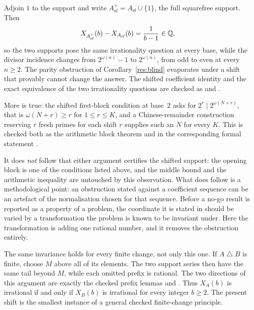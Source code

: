 \documentclass[11pt]{article}
\newcommand{\Asf}{A_{\mathrm{sf}}}
\begin{document}
Adjoin $1$ to the support and write $\Asf^{+}=\Asf\cup\{1\}$, the full
squarefree support.  Then
\[
  X_{\Asf^{+}}(b)-X_{\Asf}(b)=\frac1{b-1}\in\Q ,
\]
so the two supports pose the same irrationality question at every base, while
the divisor incidence changes from $2^{\omega(n)}-1$ to $2^{\omega(n)}$,
from odd to even at every $n\ge2$.  The parity obstruction of
Corollary~\ref{res:blind} evaporates under a shift that provably cannot change
the answer.  The shifted coefficient identity and the exact equivalence of the
two irrationality questions are checked as
and
.

More is true: the shifted first-block condition at base~$2$ asks for
$2^{r}\mid 2^{\omega(N+r)}$, that is $\omega(N+r)\ge r$ for $1\le r\le K$, and
a Chinese-remainder construction reserving $r$ fresh primes for each shift $r$
supplies such an $N$ for every $K$.  This is checked both as the arithmetic
block theorem
and in the corresponding formal statement
.

It does \emph{not} follow that either argument certifies the shifted support:
the opening block is one of the conditions listed above, and the middle bound
and the arithmetic inequality are untouched by this observation.  What does
follow is a methodological point: an obstruction stated against a coefficient
sequence can be an artefact of the normalisation chosen for that sequence.
Before a no-go result is reported as a property of a problem, the coordinate
it is stated in should be varied by a transformation the problem is known to
be invariant under.  Here the transformation is adding one rational number,
and it removes the obstruction entirely.

The same invariance holds for every finite change, not only this one.  If
$A\mathbin{\triangle}B$ is finite, choose $M$ above all of its elements.
The two support series then have the same tail beyond $M$, while each omitted
prefix is rational.  The two directions of this argument are exactly the
checked prefix lemmas
and
.
Thus $X_A(b)$ is irrational if and only if $X_B(b)$ is irrational for every
integer $b\ge2$.  The present shift is the smallest instance of a general
checked finite-change principle.
\end{document}
